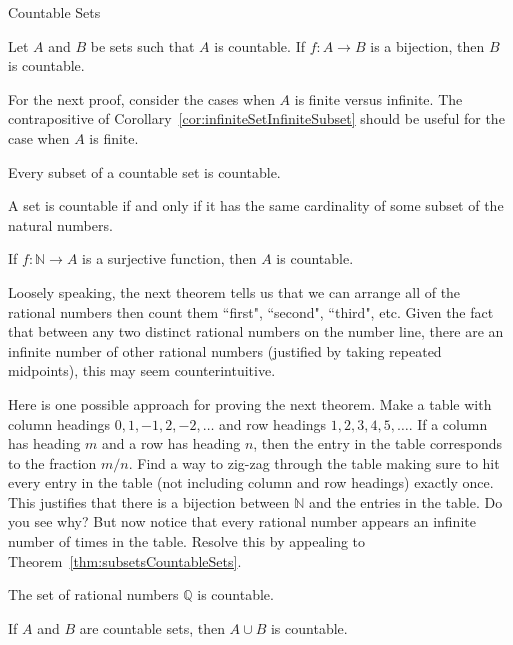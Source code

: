 \begin{section}{Countable Sets}
\begin{theorem}
Let $A$ and $B$ be sets such that $A$ is countable. If $f:A\to B$ is a bijection, then $B$ is countable.
\end{theorem}

For the next proof, consider the cases when $A$ is finite versus infinite. The contrapositive of Corollary~\ref{cor:infiniteSetInfiniteSubset} should be useful for the case when $A$ is finite.

\begin{theorem}\label{thm:subsetsCountableSets}
Every subset of a countable set is countable.
\end{theorem}

\begin{theorem}
A set is countable if and only if it has the same cardinality of some subset of the natural numbers.
\end{theorem}

\begin{theorem}
If $f:\mathbb{N}\to A$ is a surjective function, then $A$ is countable.
\end{theorem}

Loosely speaking, the next theorem tells us that we can arrange all of the rational numbers then count them ``first", ``second", ``third", etc. Given the fact that between any two distinct rational numbers on the number line, there are an infinite number of other rational numbers (justified by taking repeated midpoints), this may seem counterintuitive.  

Here is one possible approach for proving the next theorem. Make a table with column headings $0, 1, -1, 2,-2,\ldots$ and row headings $1,2,3,4,5,\ldots$.  If a column has heading $m$ and a row has heading $n$, then the entry in the table corresponds to the fraction $m/n$.  Find a way to zig-zag through the table making sure to hit every entry in the table (not including column and row headings) exactly once.  This justifies that there is a bijection between $\mathbb{N}$ and the entries in the table.  Do you see why?  But now notice that every rational number appears an infinite number of times in the table. Resolve this by appealing to Theorem~\ref{thm:subsetsCountableSets}.

\begin{theorem}
The set of rational numbers $\mathbb{Q}$ is countable.
\end{theorem}

\begin{theorem}\label{thm:union of countable sets}
If $A$ and $B$ are countable sets, then $A\cup B$ is countable.
\end{theorem}


\end{section}
